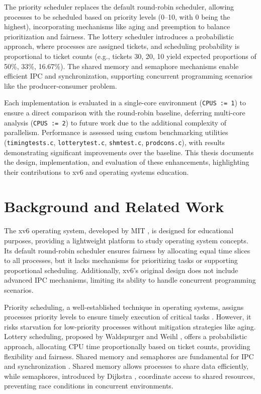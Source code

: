 \documentclass[12pt]{article}
\begin{document}
The priority scheduler replaces the default round-robin scheduler, allowing processes to be scheduled based on priority levels (0–10, with 0 being the highest), incorporating mechanisms like aging and preemption to balance prioritization and fairness. The lottery scheduler introduces a probabilistic approach, where processes are assigned tickets, and scheduling probability is proportional to ticket counts (e.g., tickets 30, 20, 10 yield expected proportions of 50\%, 33\%, 16.67\%). The shared memory and semaphore mechanisms enable efficient IPC and synchronization, supporting concurrent programming scenarios like the producer-consumer problem.

Each implementation is evaluated in a single-core environment (\texttt{CPUS := 1}) to ensure a direct comparison with the round-robin baseline, deferring multi-core analysis (\texttt{CPUS := 2}) to future work due to the additional complexity of parallelism. Performance is assessed using custom benchmarking utilities (\texttt{timingtests.c}, \texttt{lotterytest.c}, \texttt{shmtest.c}, \texttt{prodcons.c}), with results demonstrating significant improvements over the baseline. This thesis documents the design, implementation, and evaluation of these enhancements, highlighting their contributions to xv6 and operating systems education.

\section{Background and Related Work}
\label{sec:background}

The xv6 operating system, developed by MIT \cite{xv6}, is designed for educational purposes, providing a lightweight platform to study operating system concepts. Its default round-robin scheduler ensures fairness by allocating equal time slices to all processes, but it lacks mechanisms for prioritizing tasks or supporting proportional scheduling. Additionally, xv6’s original design does not include advanced IPC mechanisms, limiting its ability to handle concurrent programming scenarios.

Priority scheduling, a well-established technique in operating systems, assigns processes priority levels to ensure timely execution of critical tasks \cite{tanenbaum2008modern}. However, it risks starvation for low-priority processes without mitigation strategies like aging. Lottery scheduling, proposed by Waldspurger and Weihl \cite{waldspurger1994lottery}, offers a probabilistic approach, allocating CPU time proportionally based on ticket counts, providing flexibility and fairness. Shared memory and semaphores are fundamental for IPC and synchronization \cite{silberschatz2018operating}. Shared memory allows processes to share data efficiently, while semaphores, introduced by Dijkstra \cite{dijkstra1965cooperating}, coordinate access to shared resources, preventing race conditions in concurrent environments.
\end{document}
